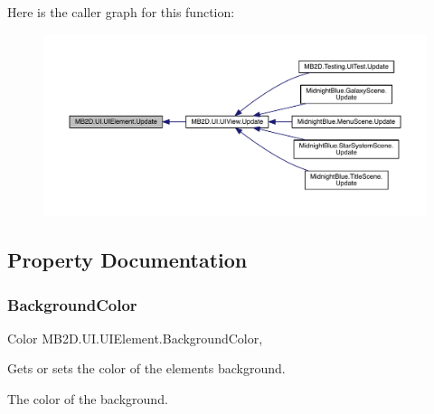 Here is the caller graph for this function\+:
\nopagebreak
\begin{figure}[H]
\begin{center}
\leavevmode
\includegraphics[width=350pt]{class_m_b2_d_1_1_u_i_1_1_u_i_element_aa97bcbe44f3fac8a13e2febca23b2d4d_icgraph}
\end{center}
\end{figure}


\subsection{Property Documentation}
\hypertarget{class_m_b2_d_1_1_u_i_1_1_u_i_element_abcd3eabd4db0998955a1e856a41d3d84}{}\label{class_m_b2_d_1_1_u_i_1_1_u_i_element_abcd3eabd4db0998955a1e856a41d3d84} 
\subsubsection{\texorpdfstring{Background\+Color}{BackgroundColor}}
{\footnotesize\ttfamily Color M\+B2\+D.\+U\+I.\+U\+I\+Element.\+Background\+Color\hspace{0.3cm}{\ttfamily [get]}, {\ttfamily [set]}}



Gets or sets the color of the elements background. 

The color of the background.\hypertarget{class_m_b2_d_1_1_u_i_1_1_u_i_element_af5fa3d6d3757bfe0a8d5ddd03d897c6c}{}\label{class_m_b2_d_1_1_u_i_1_1_u_i_element_af5fa3d6d3757bfe0a8d5ddd03d897c6c} 
